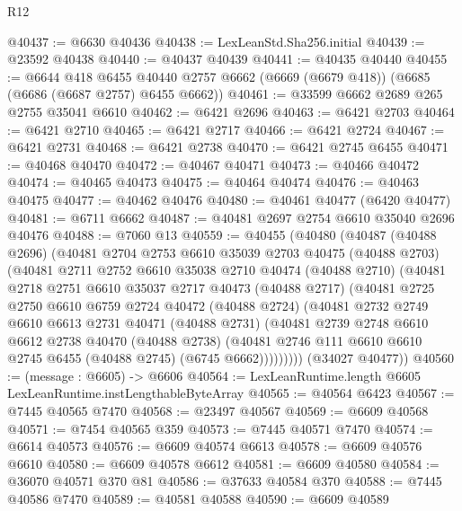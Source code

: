 \begin{lexlean}{R12}
\begin{coremodule}
@40437 := @6630 @40436
@40438 := LexLeanStd.Sha256.initial
@40439 := @23592 @40438
@40440 := @40437 @40439
@40441 := @40435 @40440
@40455 := @6644
    @418
    @6455
    @40440
    @2757
    @6662
    (@6669 (@6679 @418))
    (@6685 (@6686 (@6687 @2757) @6455 @6662))
@40461 := @33599 @6662 @2689 @265 @2755 @35041 @6610
@40462 := @6421 @2696
@40463 := @6421 @2703
@40464 := @6421 @2710
@40465 := @6421 @2717
@40466 := @6421 @2724
@40467 := @6421 @2731
@40468 := @6421 @2738
@40470 := @6421 @2745 @6455
@40471 := @40468 @40470
@40472 := @40467 @40471
@40473 := @40466 @40472
@40474 := @40465 @40473
@40475 := @40464 @40474
@40476 := @40463 @40475
@40477 := @40462 @40476
@40480 := @40461 @40477 (@6420 @40477)
@40481 := @6711 @6662
@40487 := @40481 @2697 @2754 @6610 @35040 @2696 @40476
@40488 := @7060 @13
@40559 := @40455
    (@40480
      (@40487
        (@40488 @2696)
        (@40481
          @2704
          @2753
          @6610
          @35039
          @2703
          @40475
          (@40488 @2703)
          (@40481
            @2711
            @2752
            @6610
            @35038
            @2710
            @40474
            (@40488 @2710)
            (@40481
              @2718
              @2751
              @6610
              @35037
              @2717
              @40473
              (@40488 @2717)
              (@40481
                @2725
                @2750
                @6610
                @6759
                @2724
                @40472
                (@40488 @2724)
                (@40481
                  @2732
                  @2749
                  @6610
                  @6613
                  @2731
                  @40471
                  (@40488 @2731)
                  (@40481
                    @2739
                    @2748
                    @6610
                    @6612
                    @2738
                    @40470
                    (@40488 @2738)
                    (@40481 @2746 @111 @6610 @6610 @2745 @6455 (@40488 @2745) (@6745 @6662)))))))))
      (@34027 @40477))
@40560 := (message : @6605) -> @6606
@40564 := LexLeanRuntime.length @6605 LexLeanRuntime.instLengthableByteArray
@40565 := @40564 @6423
@40567 := @7445 @40565 @7470
@40568 := @23497 @40567
@40569 := @6609 @40568
@40571 := @7454 @40565 @359
@40573 := @7445 @40571 @7470
@40574 := @6614 @40573
@40576 := @6609 @40574 @6613
@40578 := @6609 @40576 @6610
@40580 := @6609 @40578 @6612
@40581 := @6609 @40580
@40584 := @36070 @40571 @370 @81
@40586 := @37633 @40584 @370
@40588 := @7445 @40586 @7470
@40589 := @40581 @40588
@40590 := @6609 @40589

\end{coremodule}
\end{lexlean}
